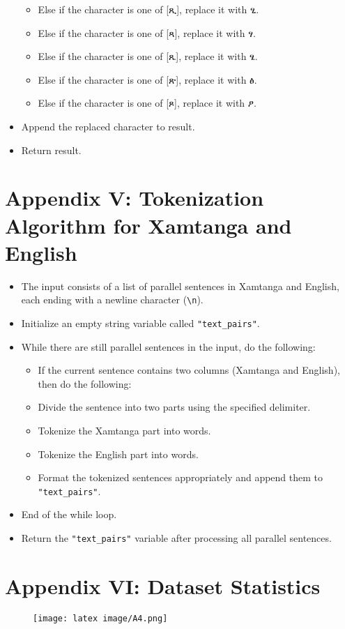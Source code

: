 \begin{itemize}
\begin{itemize}
        \item Else if the character is one of [ጺ], replace it with ፂ.
        \item Else if the character is one of [ጻ], replace it with ፃ.
        \item Else if the character is one of [ጼ], replace it with ፄ.
        \item Else if the character is one of [ጽ], replace it with ፅ.
        \item Else if the character is one of [ጾ], replace it with ፆ.
    \end{itemize}
    \item Append the replaced character to result.
    \item Return result.
\end{itemize}
\section*{Appendix V: Tokenization Algorithm for Xamtanga and English}
\begin{itemize}
    \item The input consists of a list of parallel sentences in Xamtanga and English, each ending with a newline character (\texttt{\textbackslash n}).
    \item Initialize an empty string variable called \texttt{"text\_pairs"}.
    \item While there are still parallel sentences in the input, do the following:
    \begin{itemize}
        \item If the current sentence contains two columns (Xamtanga and English), then do the following:
        \item Divide the sentence into two parts using the specified delimiter.
        \item Tokenize the Xamtanga part into words.
        \item Tokenize the English part into words.
        \item Format the tokenized sentences appropriately and append them to \texttt{"text\_pairs"}.
    \end{itemize}
    \item End of the while loop.
    \item Return the \texttt{"text\_pairs"} variable after processing all parallel sentences.
\end{itemize}
\section*{Appendix VI: Dataset Statistics}
\begin{figure}[H]
    \centering
    \texttt{[image: latex image/A4.png]}
    \label{fig:dataset_stats}
\end{figure}













